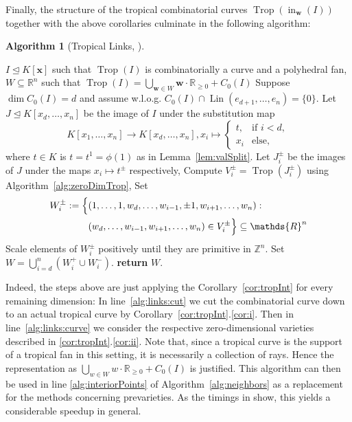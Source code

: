 \documentclass[
  paper=a4,
  titlepage,
  bibliography=totoc,
  pagesize=pdftex
]{scrartcl}
\numberwithin{figure}{section}
\numberwithin{equation}{section}
\numberwithin{table}{section}
\newcommand*\setZ{\mathds{Z}}
\newcommand*\setR{\mathds{R}}
\let\vec\mathbf
\let\idealof\trianglelefteq
\DeclareMathOperator{\Trop}{Trop}
\DeclareMathOperator{\initial}{in}
\DeclareMathOperator{\Lin}{Lin}
\theoremstyle{definition}
\newtheorem{algo}[definition]{Algorithm}
\numberwithin{definition}{section}
\begin{document}
Finally, the structure of the tropical combinatorial curves $\Trop(\initial_{\vec w}(I))$ together
with the above corollaries culminate in the following algorithm:

\begin{algo}[Tropical Links, {\cite[Algorithm~4.5]{tropPointsLinks}}]\
  \label{alg:tropLinks}
  \begin{algorithmic}[1]
    \Require $I \idealof K[\vec x]$ such that $\Trop(I)$ is combinatorially a curve and a
    polyhedral fan,
    \Ensure $W \subseteq \setR^n$ such that $\Trop(I) = \bigcup_{\vec w \in W} \vec w
      \cdot \setR_{\geq0} + C_0(I)$
    \State Suppose $\dim C_0(I) = d$ and assume w.l.o.g. $C_0(I) \cap \Lin(e_{d+1}, \dots,
      e_n) = \{0\}$.
    \State Let $J \idealof K[x_d, \dots, x_n]$ be the image of $I$ under the substitution
      map
      \[
        K[x_1, \dots, x_n] \to K[x_d, \dots, x_n], x_i \mapsto
        \begin{cases}
          t, & \text{if } i < d, \\
          x_i & \text{else},
        \end{cases}
      \]
      where $t \in K$ is $t = t^1 = \phi(1)$ as in Lemma~\ref{lem:valSplit}.
      \label{alg:links:cut}
      \State Let $J_i^\pm$ be the images of $J$ under the maps $x_i \mapsto t^\pm$
        respectively,
        \label{alg:links:curve}
      \State Compute $V_i^\pm = \Trop(J_i^\pm)$ using Algorithm~\ref{alg:zeroDimTrop},
      \State Set
        \begin{align*}
          W_i^\pm := \Bigl\{
            &(1, \dots, 1, w_d, \dots, w_{i-1}, \pm1, w_{i+1}, \dots, w_n) : \\
            &(w_d, \dots, w_{i-1}, w_{i+1}, \dots, w_n) \in V_i^\pm
          \Bigr\} \subseteq \setR^n
        \end{align*}
      \State Scale elements of $W_i^\pm$ positively until they are primitive in $\setZ^n$.
    \EndFor
    \State Set $W = \bigcup_{i=d}^n (W_i^+ \cup W_i^-)$.
    \State\textbf{return} $W$.
  \end{algorithmic}
\end{algo}

Indeed, the steps above are just applying the Corollary~\ref{cor:tropInt} for every
remaining dimension: In line~\ref{alg:links:cut} we cut the combinatorial curve down to an
actual tropical curve by Corollary~\ref{cor:tropInt}.\ref{cor:i}. Then in
line~\ref{alg:links:curve} we consider the respective zero-dimensional varieties described
in \ref{cor:tropInt}.\ref{cor:ii}. Note that, since a tropical curve is the support of a
tropical fan in this setting, it is necessarily a collection of rays. Hence the
representation as $\bigcup_{w \in W} w\cdot \setR_{\geq0} + C_0(I)$ is justified. This
algorithm can then be used in line \ref{alg:interiorPoints} of
Algorithm~\ref{alg:neighbors} as a replacement for the methods concerning prevarieties. As
the timings in \cite{tropPointsLinks} show, this yields a considerable speedup in general.
\end{document}
